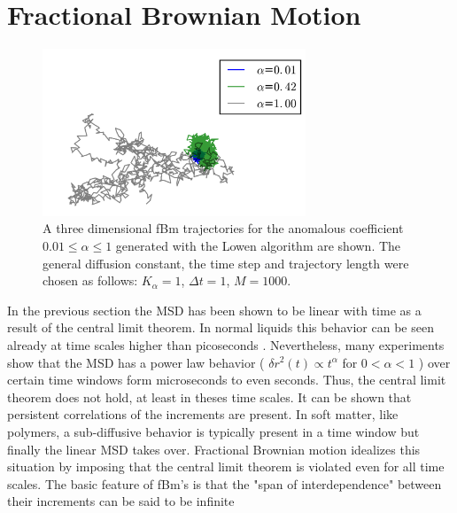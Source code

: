\documentclass[
  a4paper,BCOR10mm,oneside,
  headsepline,footsepline,%
  fleqn,openbib
]{scrbook}
\begin{document}


\section{Fractional Brownian Motion}\label{sectionfrac}
\begin{figure}
\centering
\includegraphics[width=0.7\textwidth]{./data/trajectories_differentalpha1234.png}
\caption{A three dimensional fBm trajectories for the anomalous coefficient $0.01\leq\alpha\leq 1$ generated with the Lowen algorithm are shown. The general diffusion constant, the time step and trajectory length were chosen as follows:  $K_{\alpha}=1$, $\Delta t=1$, $M=1000$.}
\label{alphachangetrajectory}
\end{figure}
In the previous section the MSD has been shown to be linear with time as a result of the central limit theorem. In normal liquids this behavior can be seen already at time scales higher than picoseconds \cite{Hofling2013}. Nevertheless, many experiments show that the MSD has a power law behavior ( $\delta r ^2 (t) \propto t^{\alpha}$ for  $0 < \alpha < 1$ ) over certain time windows form  microseconds to even seconds. Thus, the central limit theorem does not hold, at least in theses time scales. It can be shown that persistent correlations of the increments are present. In soft matter, like polymers, a sub-diffusive behavior is typically present in a time window but finally the linear MSD takes over. Fractional Brownian motion idealizes this situation by imposing that the central limit theorem is violated even for all time scales. The basic feature of fBm's is that the "span of interdependence" between their increments can be said to be infinite \cite{Mandelbrot1968} \par
\end{document}
